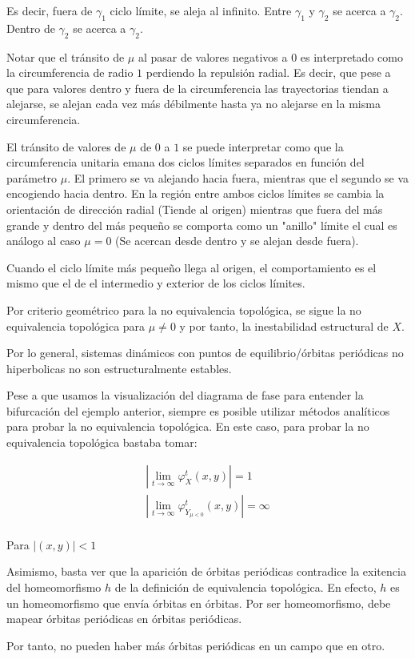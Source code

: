 \begin{exmp}
\begin{enumerate}
		Es decir, fuera de $\gamma_1$ ciclo límite, se aleja al infinito. Entre $\gamma_1$ y $\gamma_2$ se acerca a $\gamma_2$. Dentro de $\gamma_2$ se acerca a $\gamma_2$. 
	\end{enumerate}
	
	
	Notar que el tránsito de $\mu $ al pasar de valores negativos a $0$ es interpretado como la circumferencia de radio $1$ perdiendo la repulsión radial. Es decir, que pese a que para valores dentro y fuera de la circumferencia las trayectorias tiendan a alejarse, se alejan cada vez más débilmente hasta ya no alejarse en la misma circumferencia.
	
	El tránsito de valores de $\mu$ de $0$ a $1$ se puede interpretar como que la circumferencia unitaria emana dos ciclos límites separados en función del parámetro $\mu$. El primero se va alejando hacia fuera, mientras que el segundo se va encogiendo hacia dentro. En la región entre ambos ciclos límites se cambia la orientación de dirección radial (Tiende al origen) mientras que fuera del más grande y dentro del más pequeño se comporta como un "anillo" límite el cual es análogo al caso $\mu = 0$ (Se acercan desde dentro y se alejan desde fuera).
	
	Cuando el ciclo límite más pequeño llega al origen, el comportamiento es el mismo que el de el intermedio y exterior de los ciclos límites.
	
	Por criterio geométrico para la no equivalencia topológica, se sigue la no equivalencia topológica para $\mu \neq 0$ y por tanto, la inestabilidad estructural de $X$.
	
	
	Por lo general, sistemas dinámicos  con puntos de equilibrio/órbitas periódicas no hiperbolicas no son estructuralmente estables.
	
	Pese a que usamos la visualización del diagrama de fase para entender la bifurcación del ejemplo anterior, siempre es posible utilizar métodos analíticos para probar la no equivalencia topológica. En este caso, para probar la no equivalencia topológica bastaba tomar: 
	
	
	\begin{align*}
		|\lim_{t\to \infty } \varphi^t_{X}(x,y)| = 1\\
		
		|\lim_{t\to \infty } \varphi^t_{Y_{\mu<0}}(x,y)| = \infty\\
	\end{align*}
	
	Para $|(x,y)|<1$    
	
	Asimismo, basta ver que la aparición de órbitas periódicas contradice la exitencia del homeomorfismo $h$ de la definición de equivalencia topológica. En efecto, $h$ es un homeomorfismo que envía órbitas en órbitas. Por ser homeomorfismo, debe mapear órbitas periódicas en órbitas periódicas.
	
	Por tanto, no pueden haber más órbitas periódicas en un campo que en otro.
\end{exmp}


